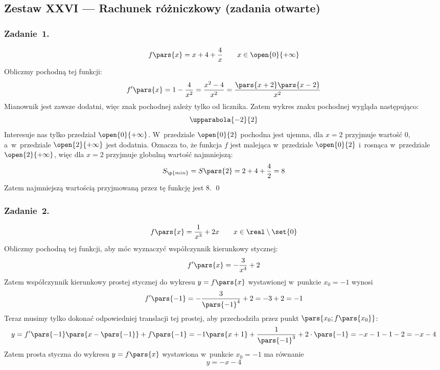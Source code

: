 \subsection*{Zestaw XXVI --- Rachunek różniczkowy (zadania otwarte)}
\subsubsection*{Zadanie~1.}
\begin{equation*}
    f\pars{x} = x + 4 + \frac{4}{x} \qquad x \in \open{0}{+\infty}
\end{equation*}
Obliczmy pochodną tej funkcji:
\begin{equation*}
    f'\pars{x}
        = 1 - \frac{4}{x^2}
        = \frac{x^2 - 4}{x^2}
        = \frac{\pars{x + 2}\pars{x - 2}}{x^2}
\end{equation*}
Mianownik jest zawsze dodatni, więc znak pochodnej zależy tylko od licznika. Zatem wykres znaku pochodnej wygląda następująco:
\begin{equation*}
    \upparabola{-2}{2}
\end{equation*}
Interesuje nas tylko przedział \(\open{0}{+\infty}\). W~przedziale \(\open{0}{2}\) pochodna jest ujemna, dla \(x = 2\) przyjmuje wartość \(0\), a~w~przedziale \(\open{2}{+\infty}\) jest dodatnia. Oznacza to, że funkcja \(f\) jest malejąca w~przedziale \(\open{0}{2}\) i~rosnąca w~przedziale \(\open{2}{+\infty}\), więc dla \(x = 2\) przyjmuje globalną wartość najmniejszą:
\begin{equation*}
    S_\p{min} = S\pars{2} = 2 + 4 + \frac{4}{2} = 8
\end{equation*}
Zatem najmniejszą wartością przyjmowaną przez tę funkcję jest \(8\).
\qed
\subsubsection*{Zadanie~2.}
\begin{equation*}
    f\pars{x} = \frac{1}{x^3} + 2x \qquad x \in \real \setminus \set{0}
\end{equation*}
Obliczmy pochodną tej funkcji, aby móc wyznaczyć współczynnik kierunkowy stycznej:
\begin{equation*}
    f'\pars{x} = -\frac{3}{x^4} + 2
\end{equation*}
Zatem współczynnik kierunkowy prostej stycznej do wykresu \(y = f\pars{x}\) wystawionej w~punkcie \(x_0 = -1\) wynosi
\begin{equation*}
    f'\pars{-1}
        = -\frac{3}{\pars{-1}^4} + 2
        = -3 + 2
        = -1
\end{equation*}
Teraz musimy tylko dokonać odpowiedniej translacji tej prostej, aby przechodziła przez punkt \(\pars{x_0; f\pars{x_0}}\):
\begin{equation*}
    y
        = f'\pars{-1}\pars{x - \pars{-1}} + f\pars{-1}
        = -1\pars{x + 1} + \frac{1}{\pars{-1}^3} + 2 \cdot \pars{-1}
        = -x - 1 - 1 - 2
        = -x - 4
\end{equation*}
Zatem prosta styczna do wykresu \(y = f\pars{x}\) wystawiona w~punkcie \(x_0 = -1\) ma równanie
\begin{equation*}
    y = -x - 4
\end{equation*}
